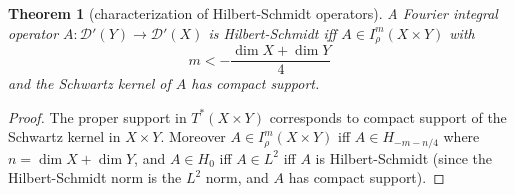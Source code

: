 \documentclass[reqno,12pt,letterpaper]{amsart}
\newtheorem{theorem}{Theorem}[section]
\theoremstyle{definition}
\begin{document}
\begin{theorem}[characterization of Hilbert-Schmidt operators]
A Fourier integral operator $A: \mathcal D'(Y) \to \mathcal D'(X)$ is Hilbert-Schmidt iff $A \in I^m_\rho(X \times Y)$ with
$$m < -\frac{\dim X + \dim Y}{4}$$
and the Schwartz kernel of $A$ has compact support.
\end{theorem}
\begin{proof}
The proper support in $T^*(X \times Y)$ corresponds to compact support of the Schwartz kernel in $X \times Y$.
Moreover $A \in I^m_\rho(X \times Y)$ iff $A \in H_{-m - n/4}$ where $n = \dim X + \dim Y$, and $A \in H_0$ iff $A \in L^2$ iff $A$ is Hilbert-Schmidt (since the Hilbert-Schmidt norm is the $L^2$ norm, and $A$ has compact support).
\end{proof}




\printbibliography
\end{document}
